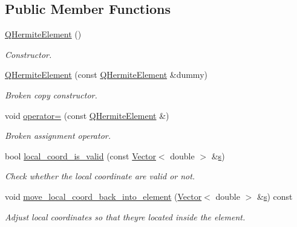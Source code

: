 \subsection*{Public Member Functions}
\begin{DoxyCompactItemize}
\item 
\hyperlink{classoomph_1_1QHermiteElement_a226d0763bce1e477ee64254398a2c677}{Q\+Hermite\+Element} ()
\begin{DoxyCompactList}\small\item\em Constructor. \end{DoxyCompactList}\item 
\hyperlink{classoomph_1_1QHermiteElement_a6dce1c70656dfcd8da365462b959e709}{Q\+Hermite\+Element} (const \hyperlink{classoomph_1_1QHermiteElement}{Q\+Hermite\+Element} \&dummy)
\begin{DoxyCompactList}\small\item\em Broken copy constructor. \end{DoxyCompactList}\item 
void \hyperlink{classoomph_1_1QHermiteElement_a2c631218863046da393b0a137ccecee9}{operator=} (const \hyperlink{classoomph_1_1QHermiteElement}{Q\+Hermite\+Element} \&)
\begin{DoxyCompactList}\small\item\em Broken assignment operator. \end{DoxyCompactList}\item 
bool \hyperlink{classoomph_1_1QHermiteElement_a29a36f3b1e8f07d4d7b5e14aeb79c422}{local\+\_\+coord\+\_\+is\+\_\+valid} (const \hyperlink{classoomph_1_1Vector}{Vector}$<$ double $>$ \&\hyperlink{cfortran_8h_ab7123126e4885ef647dd9c6e3807a21c}{s})
\begin{DoxyCompactList}\small\item\em Check whether the local coordinate are valid or not. \end{DoxyCompactList}\item 
void \hyperlink{classoomph_1_1QHermiteElement_a2c0eb92b2d66f0c67abebf96bb7922fc}{move\+\_\+local\+\_\+coord\+\_\+back\+\_\+into\+\_\+element} (\hyperlink{classoomph_1_1Vector}{Vector}$<$ double $>$ \&\hyperlink{cfortran_8h_ab7123126e4885ef647dd9c6e3807a21c}{s}) const
\begin{DoxyCompactList}\small\item\em Adjust local coordinates so that they\textquotesingle{}re located inside the element. \end{DoxyCompactList}\item 

\end{DoxyCompactItemize}
